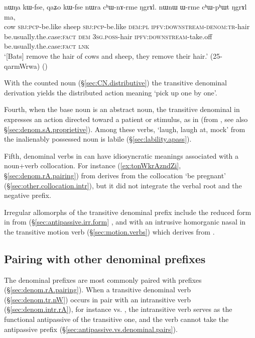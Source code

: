 \begin{exe}
\ex \label{ex:chWnArme}
\gll  nɯŋa kɯ-fse, qaʑo kɯ-fse nɯra cʰɯ-nɤ-rme ŋgrɤl. nɯnɯ ɯ-rme cʰɯ-pʰɯt ŋgrɤl ma, \\
cow \textsc{sbj}:\textsc{pcp}-be.like sheep \textsc{sbj}:\textsc{pcp}-be.like \textsc{dem}:\textsc{pl} \textsc{ipfv}:\textsc{downstream}-\textsc{denom}:\textsc{tr}-hair be.usually.the.case:\textsc{fact} \textsc{dem} \textsc{3sg}.\textsc{poss}-hair \textsc{ipfv}:\textsc{downstream}-take.off  be.usually.the.case:\textsc{fact} \textsc{lnk} \\
\glt `[Bats] remove the hair of cows and sheep, they remove their hair.' (25-qarmWrwa)
()
\end{exe}

With the counted noun  (§\ref{sec:CN.distributive}) the transitive denominal derivation  yields the distributed action meaning  `pick up one by one'.

Fourth, when the base noun is an abstract noun, the transitive denominal in  expresses an action directed toward a patient or stimulus, as in  (from 
, see also §\ref{sec:denom.sA.proprietive}). Among these verbs,  `laugh, laugh at, mock' from the inalienably possessed noun  is labile (§\ref{sec:lability.apass}).


  
Fifth, denominal verbs in  can have idiosyncratic meanings associated with a noun+verb collocation. For instance  (\ref{ex:tonWkrAzndZi}, §\ref{sec:denom.rA.pairing}) from   derives from the collocation  `be pregnant' (§\ref{sec:other.collocation.intr}), but it did not integrate the verbal root  and the negative prefix.

Irregular allomorphs of the transitive denominal  prefix include the reduced form  in  from  (§\ref{sec:antipassive.irr.form} , and  with an intrusive homorganic nasal in the transitive motion verb  (§\ref{sec:motion.verbs}) which derives from .

\subsection{Pairing with other denominal prefixes}  \label{sec:denom.nW.pairing}
The   denominal prefixes are most commonly paired with  prefixes (§\ref{sec:denom.rA.pairing}). When a transitive  denominal verb (§\ref{sec:denom.tr.nW}) occurs in pair with an intransitive   verb (§\ref{sec:denom.intr.rA}), for instance   vs. , the intransitive verb serves as the functional antipassive of the transitive one, and the  verb cannot take the antipassive  prefix (§\ref{sec:antipassive.vs.denominal.pairs}).

